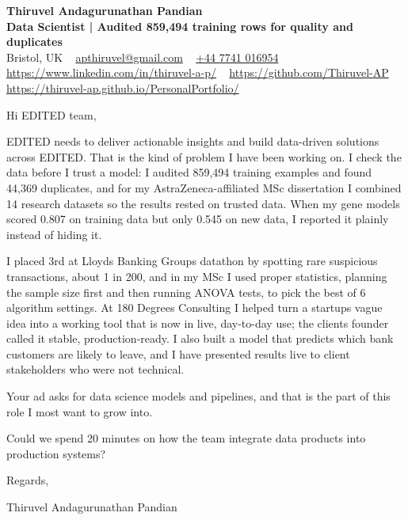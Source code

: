 \documentclass[11pt,a4paper]{article}
\newcommand{\num}[1]{\textbf{#1}}   %
\begin{document}
\raggedright
\pagestyle{empty}

\begin{center}
    {\LARGE \color{linkblue} \textbf{Thiruvel Andagurunathan Pandian}}\\[0.2cm]
    {\color{headernavy}\small\textbf{Data Scientist | Audited \num{859,494} training rows for quality and duplicates}}\\[0.2cm]
    {\small Bristol, UK\nobreak\ \,\textbar\, \href{mailto:apthiruvel@gmail.com}{apthiruvel@gmail.com}\nobreak\ \,\textbar\, \href{tel:+447741016954}{+44 7741 016954}\nobreak\ \,\textbar\, \href{https://www.linkedin.com/in/thiruvel-a-p/}{https://www.linkedin.com/in/thiruvel-a-p/}\nobreak\ \,\textbar\, \href{https://github.com/Thiruvel-AP}{https://github.com/Thiruvel-AP}\nobreak\ \,\textbar\, \href{https://thiruvel-ap.github.io/PersonalPortfolio/}{https://thiruvel-ap.github.io/PersonalPortfolio/}}

\end{center}

\vspace{0.4cm}

\noindent
Hi EDITED team,

EDITED needs to deliver actionable insights and build data-driven solutions across EDITED. That is the kind of problem I have been working on. I check the data before I trust a model: I audited 859,494 training examples and found 44,369 duplicates, and for my AstraZeneca-affiliated MSc dissertation I combined 14 research datasets so the results rested on trusted data. When my gene models scored 0.807 on training data but only 0.545 on new data, I reported it plainly instead of hiding it.

I placed 3rd at Lloyd\textquotesingle{}s Banking Group\textquotesingle{}s datathon by spotting rare suspicious transactions, about 1 in 200, and in my MSc I used proper statistics, planning the sample size first and then running ANOVA tests, to pick the best of 6 algorithm settings. At 180 Degrees Consulting I helped turn a startup\textquotesingle{}s vague idea into a working tool that is now in live, day-to-day use; the client\textquotesingle{}s founder called it \textquotedbl{}stable, production-ready\textquotedbl{}. I also built a model that predicts which bank customers are likely to leave, and I have presented results live to client stakeholders who were not technical.

Your ad asks for data science models and pipelines, and that is the part of this role I most want to grow into.

Could we spend 20 minutes on how the team integrate data products into production systems?

\vspace{0.5cm}

Regards,

Thiruvel Andagurunathan Pandian
\end{document}
